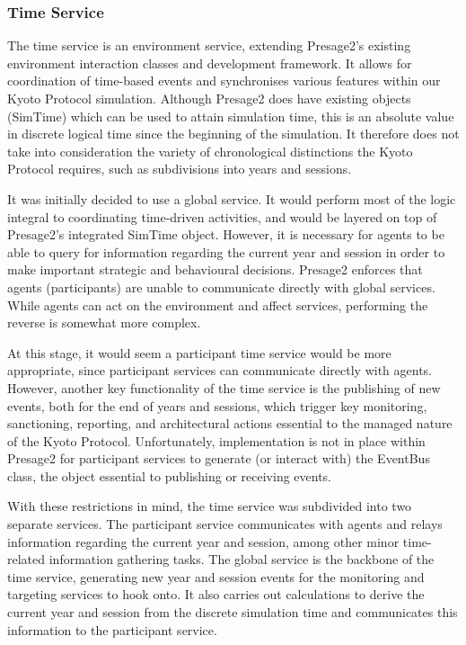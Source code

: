 \subsubsection{Time Service}

The time service is an environment service, extending Presage2's existing environment interaction classes and development framework. It allows for coordination of time-based events and synchronises various features within our Kyoto Protocol simulation. Although Presage2 does have existing objects (SimTime) which can be used to attain simulation time, this is an absolute value in discrete logical time since the beginning of the simulation. It therefore does not take into consideration the variety of chronological distinctions the Kyoto Protocol requires, such as subdivisions into years and sessions.

It was initially decided to use a global service. It would perform most of the logic integral to coordinating time-driven activities, and would be layered on top of Presage2's integrated SimTime object. However, it is necessary for agents to be able to query for information regarding the current year and session in order to make important strategic and behavioural decisions. Presage2 enforces that agents (participants) are unable to communicate directly with global services. While agents can act on the environment and affect services, performing the reverse is somewhat more complex.

At this stage, it would seem a participant time service would be more appropriate, since participant services can communicate directly with agents. However, another key functionality of the time service is the publishing of new events, both for the end of years and sessions, which trigger key monitoring, sanctioning, reporting, and architectural actions essential to the managed nature of the Kyoto Protocol. Unfortunately, implementation is not in place within Presage2 for participant services to generate (or interact with) the EventBus class, the object essential to publishing or receiving events.

With these restrictions in mind, the time service was subdivided into two separate services. The participant service communicates with agents and relays information regarding the current year and session, among other minor time-related information gathering tasks. The global service is the backbone of the time service, generating new year and session events for the monitoring and targeting services to hook onto. It also carries out calculations to derive the current year and session from the discrete simulation time and communicates this information to the participant service.

